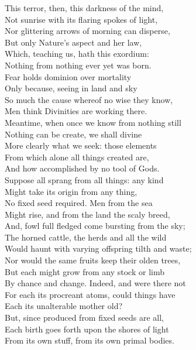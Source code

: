 
This terror, then, this darkness of the mind,\\
Not sunrise with its flaring spokes of light,\\
Nor glittering arrows of morning can disperse,\\
But only Nature's aspect and her law,\\
Which, teaching us, hath this exordium:\\
Nothing from nothing ever yet was born.\\
Fear holds dominion over mortality\\
Only because, seeing in land and sky\\
So much the cause whereof no wise they know,\\
Men think Divinities are working there.\\
Meantime, when once we know from nothing still\\
Nothing can be create, we shall divine\\
More clearly what we seek: those elements\\
From which alone all things created are,\\
And how accomplished by no tool of Gods.\\
Suppose all sprang from all things: any kind\\
Might take its origin from any thing,\\
No fixed seed required. Men from the sea\\
Might rise, and from the land the scaly breed,\\
And, fowl full fledged come bursting from the sky;\\
The horned cattle, the herds and all the wild\\
Would haunt with varying offspring tilth and waste;\\
Nor would the same fruits keep their olden trees,\\
But each might grow from any stock or limb\\
By chance and change. Indeed, and were there not\\
For each its procreant atoms, could things have\\
Each its unalterable mother old?\\
But, since produced from fixed seeds are all,\\
Each birth goes forth upon the shores of light\\
From its own stuff, from its own primal bodies.\\
